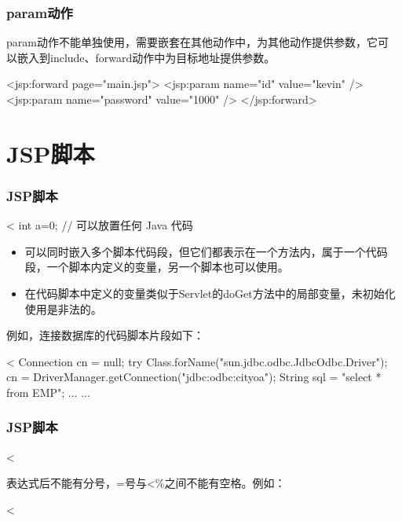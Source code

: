 \begin{frame}[fragile] %
  \frametitle{param动作} 

  param动作不能单独使用，需要嵌套在其他动作中，为其他动作提供参数，它可
  以嵌入到include、forward动作中为目标地址提供参数。
  
  \begin{jspCode}
    <jsp:forward page="main.jsp">
      <jsp:param name="id" value="kevin" />
      <jsp:param name="password" value="1000" />
    </jsp:forward>
  \end{jspCode}
\end{frame}

\section{JSP脚本}

\begin{frame}[fragile] %
  \frametitle{JSP脚本}

  
  \begin{jspCode}
    <%
      int a=0; // 可以放置任何 Java 代码
  \end{jspCode}  
  \begin{itemize}
  \item 可以同时嵌入多个脚本代码段，但它们都表示在一个方法内，属于一个代码段，一个脚本内定义的变量，另一个脚本也可以使用。
  \item 在代码脚本中定义的变量类似于Servlet的doGet方法中的局部变量，未初始化使用是非法的。
  \end{itemize}

  {\kai 例如，连接数据库的代码脚本片段如下：}
  \begin{jspCode}
    <%
    Connection cn = null;
    try {
      Class.forName("sun.jdbc.odbc.JdbcOdbc.Driver");
      cn  = DriverManager.getConnection("jdbc:odbc:cityoa");
      String sql = "select * from EMP";
      ... ...
    }
  \end{jspCode}
\end{frame}

\begin{frame}[fragile] %
  \frametitle{JSP脚本}


  \begin{jspCode}
    <%
  \end{jspCode}
  

  表达式后不能有分号，=号与<\%之间不能有空格。例如：
  
  \begin{jspCode}
    <%
  \end{jspCode}
\end{frame}

